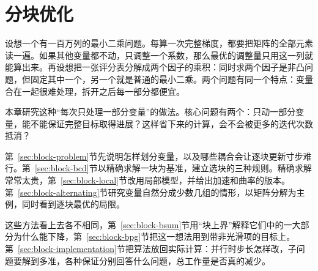 \chapter{分块优化}
\label{chap:block-optimization}

设想一个有一百万列的最小二乘问题。每算一次完整梯度，都要把矩阵的全部元素读一遍。如果其他变量都不动，只调整一个系数，那么最优的调整量只用这一列就能算出来。再设想把一张评分表分解成两个因子的乘积：同时求两个因子是非凸问题，但固定其中一个，另一个就是普通的最小二乘。两个问题有同一个特点：变量合在一起很难处理，拆开之后每一部分都便宜。

本章研究这种“每次只处理一部分变量”的做法。核心问题有两个：只动一部分变量，能不能保证完整目标取得进展？这样省下来的计算，会不会被更多的迭代次数抵消？

第~\ref{sec:block-problem}节先说明怎样划分变量，以及哪些耦合会让逐块更新寸步难行。第~\ref{sec:block-bcd}节以精确求解一块为基准，建立选块的三种规则。精确求解常常太贵，第~\ref{sec:block-local}节改用局部模型，并给出加速和曲率的版本。第~\ref{sec:block-alternating}节研究变量自然分成少数几组的情形，以矩阵分解为主例，同时看到逐块最优的局限。

这些方法看上去各不相同，第~\ref{sec:block-bsum}节用“块上界”解释它们中的一大部分为什么能下降，第~\ref{sec:block-bpg}节把这一想法用到带非光滑项的目标上。第~\ref{sec:block-implementation}节把算法放回实际计算：并行时步长怎样改，子问题要解到多准，各种保证分别回答什么问题，总工作量是否真的减少。









